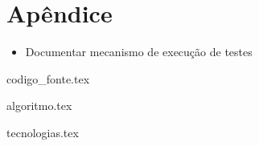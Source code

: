 \section{Apêndice}

\begin{itemize}
	\item Documentar mecanismo de execução de testes
\end{itemize}

{codigo_fonte.tex}

{algoritmo.tex}

{tecnologias.tex}

